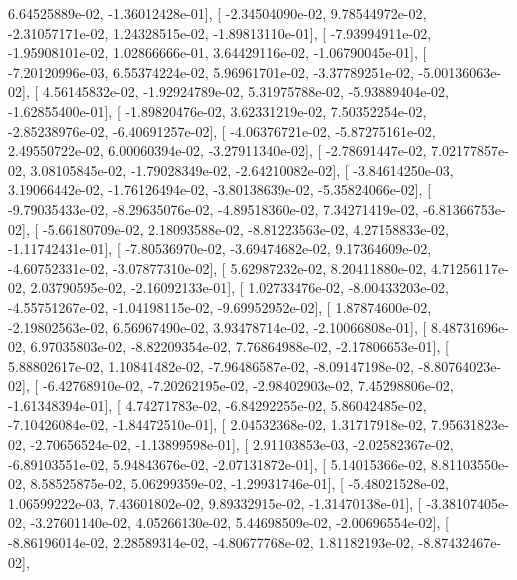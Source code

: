 \documentclass{article}
\begin{document}
          6.64525889e-02,  -1.36012428e-01],
       [ -2.34504090e-02,   9.78544972e-02,  -2.31057171e-02,
          1.24328515e-02,  -1.89813110e-01],
       [ -7.93994911e-02,  -1.95908101e-02,   1.02866666e-01,
          3.64429116e-02,  -1.06790045e-01],
       [ -7.20120996e-03,   6.55374224e-02,   5.96961701e-02,
         -3.37789251e-02,  -5.00136063e-02],
       [  4.56145832e-02,  -1.92924789e-02,   5.31975788e-02,
         -5.93889404e-02,  -1.62855400e-01],
       [ -1.89820476e-02,   3.62331219e-02,   7.50352254e-02,
         -2.85238976e-02,  -6.40691257e-02],
       [ -4.06376721e-02,  -5.87275161e-02,   2.49550722e-02,
          6.00060394e-02,  -3.27911340e-02],
       [ -2.78691447e-02,   7.02177857e-02,   3.08105845e-02,
         -1.79028349e-02,  -2.64210082e-02],
       [ -3.84614250e-03,   3.19066442e-02,  -1.76126494e-02,
         -3.80138639e-02,  -5.35824066e-02],
       [ -9.79035433e-02,  -8.29635076e-02,  -4.89518360e-02,
          7.34271419e-02,  -6.81366753e-02],
       [ -5.66180709e-02,   2.18093588e-02,  -8.81223563e-02,
          4.27158833e-02,  -1.11742431e-01],
       [ -7.80536970e-02,  -3.69474682e-02,   9.17364609e-02,
         -4.60752331e-02,  -3.07877310e-02],
       [  5.62987232e-02,   8.20411880e-02,   4.71256117e-02,
          2.03790595e-02,  -2.16092133e-01],
       [  1.02733476e-02,  -8.00433203e-02,  -4.55751267e-02,
         -1.04198115e-02,  -9.69952952e-02],
       [  1.87874600e-02,  -2.19802563e-02,   6.56967490e-02,
          3.93478714e-02,  -2.10066808e-01],
       [  8.48731696e-02,   6.97035803e-02,  -8.82209354e-02,
          7.76864988e-02,  -2.17806653e-01],
       [  5.88802617e-02,   1.10841482e-02,  -7.96486587e-02,
         -8.09147198e-02,  -8.80764023e-02],
       [ -6.42768910e-02,  -7.20262195e-02,  -2.98402903e-02,
          7.45298806e-02,  -1.61348394e-01],
       [  4.74271783e-02,  -6.84292255e-02,   5.86042485e-02,
         -7.10426084e-02,  -1.84472510e-01],
       [  2.04532368e-02,   1.31717918e-02,   7.95631823e-02,
         -2.70656524e-02,  -1.13899598e-01],
       [  2.91103853e-03,  -2.02582367e-02,  -6.89103551e-02,
          5.94843676e-02,  -2.07131872e-01],
       [  5.14015366e-02,   8.81103550e-02,   8.58525875e-02,
          5.06299359e-02,  -1.29931746e-01],
       [ -5.48021528e-02,   1.06599222e-03,   7.43601802e-02,
          9.89332915e-02,  -1.31470138e-01],
       [ -3.38107405e-02,  -3.27601140e-02,   4.05266130e-02,
          5.44698509e-02,  -2.00696554e-02],
       [ -8.86196014e-02,   2.28589314e-02,  -4.80677768e-02,
          1.81182193e-02,  -8.87432467e-02],
\end{document}

